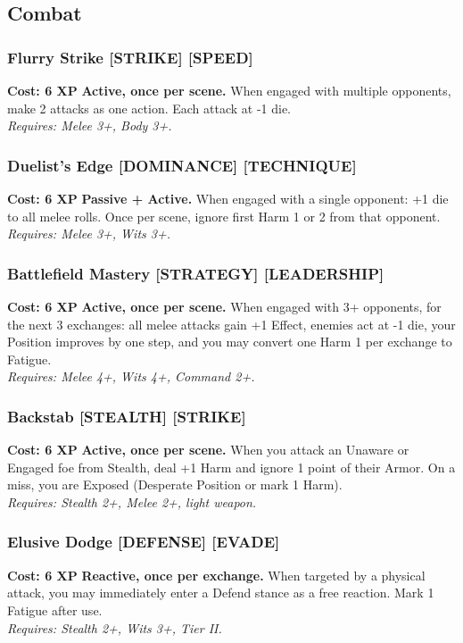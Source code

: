 \subsection*{Combat}
\label{sec:major-combat}

\subsubsection*{Flurry Strike \textnormal{[STRIKE] [SPEED]}}
\label{talent:flurry-strike}
\textbf{Cost: 6 XP} \textbf{Active, once per scene.} When engaged with multiple opponents, make 2 attacks as one action. Each attack at -1 die. \\
\textit{Requires: Melee 3+, Body 3+.}

\subsubsection*{Duelist's Edge \textnormal{[DOMINANCE] [TECHNIQUE]}}
\label{talent:duelists-edge}
\textbf{Cost: 6 XP} \textbf{Passive + Active.} When engaged with a single opponent: +1 die to all melee rolls. Once per scene, ignore first Harm 1 or 2 from that opponent. \\
\textit{Requires: Melee 3+, Wits 3+.}

\subsubsection*{Battlefield Mastery \textnormal{[STRATEGY] [LEADERSHIP]}}
\label{talent:battlefield-mastery}
\textbf{Cost: 6 XP} \textbf{Active, once per scene.} When engaged with 3+ opponents, for the next 3 exchanges: all melee attacks gain +1 Effect, enemies act at -1 die, your Position improves by one step, and you may convert one Harm 1 per exchange to Fatigue. \\
\textit{Requires: Melee 4+, Wits 4+, Command 2+.}

\subsubsection*{Backstab \textnormal{[STEALTH] [STRIKE]}}
\label{talent:backstab}
\textbf{Cost: 6 XP} \textbf{Active, once per scene.} When you attack an Unaware or Engaged foe from Stealth, deal +1 Harm and ignore 1 point of their Armor. On a miss, you are Exposed (Desperate Position or mark 1 Harm). \\
\textit{Requires: Stealth 2+, Melee 2+, light weapon.}

\subsubsection*{Elusive Dodge \textnormal{[DEFENSE] [EVADE]}}
\label{talent:elusive-dodge}
\textbf{Cost: 6 XP} \textbf{Reactive, once per exchange.} When targeted by a physical attack, you may immediately enter a Defend stance as a free reaction. Mark 1 Fatigue after use. \\
\textit{Requires: Stealth 2+, Wits 3+, Tier II.}

